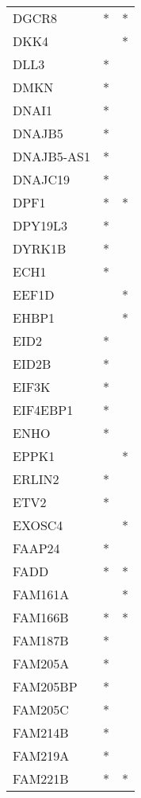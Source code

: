 \begin{longtable}{lcc}
DGCR8        &         * &       * \\
DKK4         &           &       * \\
DLL3         &         * &         \\
DMKN         &         * &         \\
DNAI1        &         * &         \\
DNAJB5       &         * &         \\
DNAJB5-AS1   &         * &         \\
DNAJC19      &         * &         \\
DPF1         &         * &       * \\
DPY19L3      &         * &         \\
DYRK1B       &         * &         \\
ECH1         &         * &         \\
EEF1D        &           &       * \\
EHBP1        &           &       * \\
EID2         &         * &         \\
EID2B        &         * &         \\
EIF3K        &         * &         \\
EIF4EBP1     &         * &         \\
ENHO         &         * &         \\
EPPK1        &           &       * \\
ERLIN2       &         * &         \\
ETV2         &         * &         \\
EXOSC4       &           &       * \\
FAAP24       &         * &         \\
FADD         &         * &       * \\
FAM161A      &           &       * \\
FAM166B      &         * &       * \\
FAM187B      &         * &         \\
FAM205A      &         * &         \\
FAM205BP     &         * &         \\
FAM205C      &         * &         \\
FAM214B      &         * &         \\
FAM219A      &         * &         \\
FAM221B      &         * &       * \\

\end{longtable}
